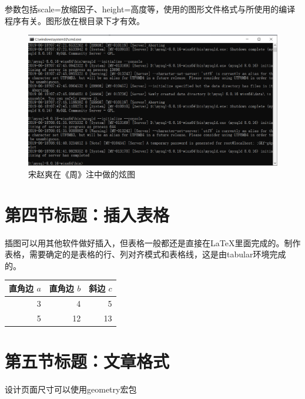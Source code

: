 \documentclass[UTF8]{ctexart}%
\begin{document}
参数包括scale=放缩因子、height=高度等，使用的图形文件格式与所使用的编译程序有关。图形放在根目录下才有效。
\begin{figure}[ht]%
	\centering%
	\includegraphics[scale=0.5]{picture1.png}
	\caption{宋赵爽在《周》注中做的炫图}%
	\label{fig:xiantu}%
\end{figure}
\section{第四节标题：插入表格}
插图可以用其他软件做好插入，但表格一般都还是直接在LaTeX里面完成的。制作表格，需要确定的是表格的行、列对齐模式和表格线，这是由tabular环境完成的。

\begin{tabular}{|rrr|}%
	\hline%
	直角边 $a$ & 直角边 $b$ & 斜边 $c$\\
	\hline
	3& 4& 5\\
	5& 12& 13\\
	\hline
\end{tabular}
\section{第五节标题：文章格式}
设计页面尺寸可以使用geometry宏包
	
\end{document}
